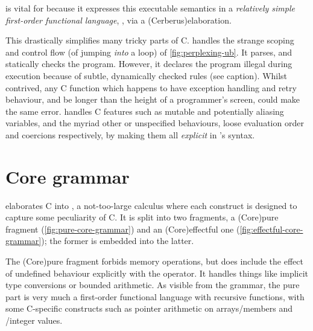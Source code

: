  is vital for  because it expresses this executable
semantics in a \emph{relatively simple first-order functional language},
, via a  \kl(Cerberus){elaboration}.

This drastically simplifies many tricky parts of C.  handles
the strange scoping and control flow (of jumping \emph{into} a loop) of
\cref{fig:perplexing-ub}. It parses, and statically checks the program.
However, it declares the program illegal during execution because of
subtle, dynamically checked rules (see caption). Whilst contrived, any C
function which happens to have exception handling and retry behaviour, and be
longer than the height of a programmer's screen, could make the same error.
 handles C features such as mutable and potentially aliasing
variables, and the myriad other  or unspecified behaviours,
\eg{} loose evaluation order and coercions respectively, by making them
all \emph{explicit} in 's syntax.

\begin{marginfigure}
    \caption{Example of subtle scoping and control-flow issues leading to
         (courtesy~\cite[p70]{memarian2022cerberus}).
        Jumping to  starts the lifetime of an object, but does not
        initialise it. Jumping to  then \emph{ends that lifetime}
        because it exits the block (lines 5\textendash{}12). By the time
        execution reaches line 8,  \emph{refers to a dead object}.
        This is why the seemingly redundant re-assignment of 
        on line 7 would prevent  in this example.}\label{fig:perplexing-ub}
\end{marginfigure}

\section{Core grammar}\label{sec:core-grammar}

 elaborates C into , a not-too-large calculus where
each construct is designed to capture some peculiarity of C. It is split into
two fragments, a \kl(Core){pure fragment} (\cref{fig:pure-core-grammar}) and an
\kl(Core){effectful one} (\cref{fig:effectful-core-grammar}); the former is
embedded into the latter.

The \kl(Core){pure fragment} forbids memory operations, but
does include the effect of undefined behaviour explicitly with the
 operator. It handles
things like implicit type conversions or bounded arithmetic. As visible from the
grammar, the pure part is very much a first-order functional language with
recursive functions, with some C-specific constructs such as pointer
arithmetic on arrays/members and /integer values.

